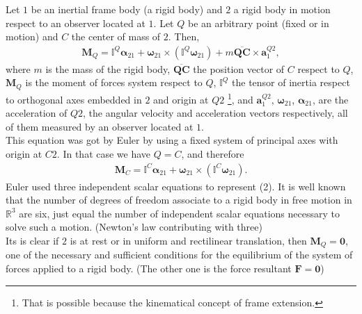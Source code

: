 \documentclass[12pt]{article}
\begin{document}
Let $1$ be an inertial frame body (a rigid body) and $2$ a rigid body in motion respect to an observer located at $1$. Let $Q$ be an arbitrary point (fixed or in motion) and $C$ the center of mass of $2$. Then,
\begin{align}
\mathbf{M}_Q=\boldsymbol{\mathbb{I}}^Q\boldsymbol{\alpha}_{21}+
\boldsymbol{\omega}_{21}\times(\boldsymbol{\mathbb{I}}^Q\boldsymbol{\omega}_{21})+
m\mathbf{\overline{QC}}\times \mathbf{a}^{Q2}_1,
\end{align}
where $m$ is the mass of the rigid body, $\mathbf{\overline{QC}}$ the position vector of $C$ respect to $Q$, $\mathbf{M}_Q$ is the moment of forces system respect to $Q$, $\boldsymbol{\mathbb{I}}^Q$ the tensor of inertia respect to orthogonal axes embedded in $2$ and origin at $Q2$ {\footnote{That is possible because the kinematical concept of frame extension.}}, and $\mathbf{a}^{Q2}_1$, $\boldsymbol{\omega}_{21}$, $\boldsymbol{\alpha}_{21}$, are the acceleration of $Q2$, the angular velocity and acceleration vectors respectively, all of them measured by an observer located at $1$. \\
This equation was got by Euler by using a  fixed system of principal axes with origin at $C2$. In that case we have $Q=C$, and therefore
\begin{align}
\mathbf{M}_C=\boldsymbol{\mathbb{I}}^C\boldsymbol{\alpha}_{21}+ \boldsymbol{\omega}_{21}\times(\boldsymbol{\mathbb{I}}^C\boldsymbol{\omega}_{21}).
\end{align}
Euler used three independent scalar equations to represent (2). It is well known that the number of degrees of freedom associate to a rigid body in free motion in $\mathbb{R}^3$ are six, just equal the number of independent scalar equations necessary to solve such a motion. (Newton's law contributing with three) \\
Its is clear if $2$ is at rest or in uniform and rectilinear translation, then $\mathbf{M}_Q=\mathbf{0}$, one  of the necessary and sufficient conditions for the equilibrium of the system of forces applied to a rigid body. (The other one is  the force resultant $\mathbf{F}=\mathbf{0}$)




\end{document}
